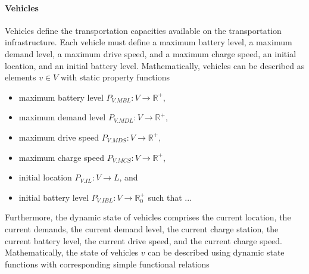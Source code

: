 \documentclass{IEEEtran}
\begin{document}
    \paragraph{Vehicles}
    Vehicles define the transportation capacities available on the transportation infrastructure.
    Each vehicle must define a maximum battery level, a maximum demand level, a maximum drive speed, and a maximum charge speed, an initial location, and an initial battery level.
    Mathematically, vehicles can be described as elements $v \in V$ with static property functions
    \begin{itemize}
        \item maximum battery level $P_{V.MBL}: V \rightarrow \mathbb{R}^+$,
        \item maximum demand level $P_{V.MDL}: V \rightarrow \mathbb{R}^+$,
        \item maximum drive speed $P_{V.MDS}: V \rightarrow \mathbb{R}^+$,
        \item maximum charge speed $P_{V.MCS}: V \rightarrow \mathbb{R}^+$,
        \item initial location $P_{V.IL}: V \rightarrow L$, and
        \item initial battery level $P_{V.IBL}: V \rightarrow \mathbb{R}_0^+$ such that ...
    \end{itemize}
    Furthermore, the dynamic state of vehicles comprises the current location, the current demands, the current demand level, the current charge station, the current battery level, the current drive speed, and the current charge speed.
    Mathematically, the state of vehicles $v$ can be described using dynamic state functions with corresponding simple functional relations
\end{document}
